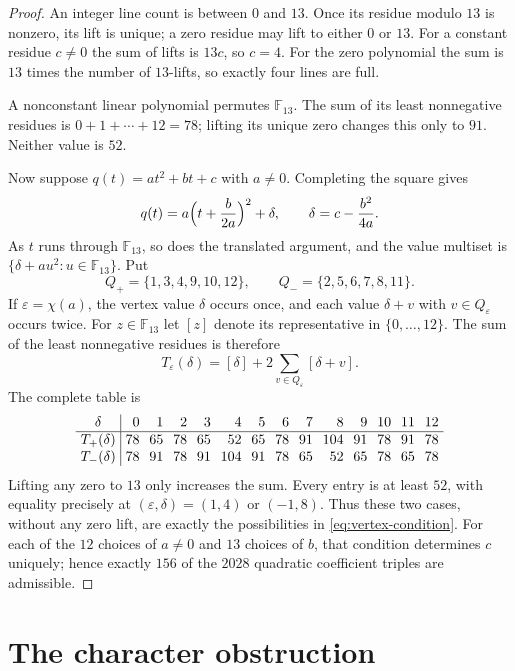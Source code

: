 \documentclass[10pt,a4paper]{amsart}
\newcommand{\F}{\mathbb F}
\begin{document}
\begin{proof}
An integer line count is between $0$ and $13$.  Once its residue modulo $13$
is nonzero, its lift is unique; a zero residue may lift to either $0$ or $13$.
For a constant residue $c\neq0$ the sum of lifts is $13c$, so $c=4$.  For the
zero polynomial the sum is $13$ times the number of $13$-lifts, so exactly
four lines are full.

A nonconstant linear polynomial permutes $\F_{13}$.  The sum of its least
nonnegative residues is $0+1+\cdots+12=78$; lifting its unique zero changes
this only to $91$.  Neither value is $52$.

Now suppose $q(t)=at^{2}+bt+c$ with $a\neq0$.  Completing the square gives
\[
  q(t)=a\Bigl(t+\frac{b}{2a}\Bigr)^{2}+\delta,
  \qquad
  \delta=c-\frac{b^{2}}{4a}.
\]
As $t$ runs through $\F_{13}$, so does the translated argument, and the value
multiset is $\{\delta+au^{2}:u\in\F_{13}\}$.  Put
\[
 Q_+=\{1,3,4,9,10,12\},\qquad Q_-=\{2,5,6,7,8,11\}.
\]
If $\varepsilon=\chi(a)$, the vertex value $\delta$ occurs once, and
each value $\delta+v$ with $v\in Q_\varepsilon$ occurs twice.
For $z\in\F_{13}$ let $[z]$ denote its representative in
$\{0,\ldots,12\}$.  The sum of the least nonnegative residues is therefore
\[
 T_\varepsilon(\delta)=[\delta]+2\sum_{v\in Q_\varepsilon}[\delta+v].
\]
The complete table is
\[
\setlength{\arraycolsep}{3.5pt}
\begin{array}{c|rrrrrrrrrrrrr}
\delta&0&1&2&3&4&5&6&7&8&9&10&11&12\\ \hline
T_+(\delta)&78&65&78&65&52&65&78&91&104&91&78&91&78\\
T_-(\delta)&78&91&78&91&104&91&78&65&52&65&78&65&78
\end{array}
\]
Lifting any zero to $13$ only increases the sum.  Every entry is at least
$52$, with equality precisely at $(\varepsilon,\delta)=(1,4)$ or
$(-1,8)$.  Thus these two cases, without any zero lift, are exactly the
possibilities in \eqref{eq:vertex-condition}.  For each of the $12$ choices
of $a\ne0$ and $13$ choices of $b$, that condition determines $c$ uniquely;
hence exactly $156$ of the $2028$ quadratic coefficient triples are admissible.
\end{proof}

\section{The character obstruction}
\end{document}
